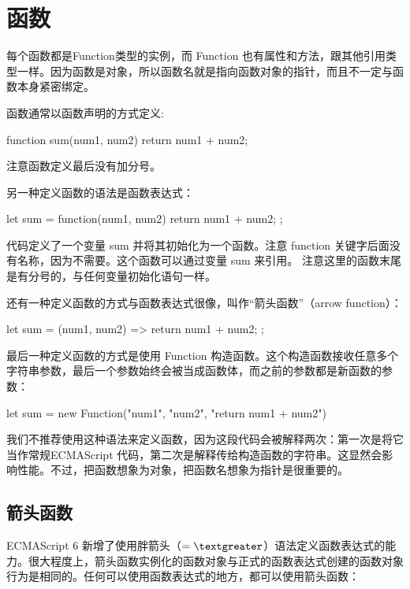 \chapter{函数}
每个函数都是Function类型的实例，而 Function 也有属性和方法，跟其他引用类型一样。因为函数是对象，所以函数名就是指向函数对象的指针，而且不一定与函数本身紧密绑定。

函数通常以函数声明的方式定义:
\begin{js}
function sum(num1, num2) {
    return num1 + num2;
}
\end{js}
注意函数定义最后没有加分号。

另一种定义函数的语法是函数表达式：
\begin{js}
let sum = function(num1, num2) {
    return num1 + num2;
};
\end{js}

代码定义了一个变量 sum 并将其初始化为一个函数。注意 function 关键字后面没有名称，因为不需要。这个函数可以通过变量 sum 来引用。 注意这里的函数末尾是有分号的，与任何变量初始化语句一样。

还有一种定义函数的方式与函数表达式很像，叫作“箭头函数”（arrow function）：
\begin{js}
let sum = (num1, num2) => {
    return num1 + num2;
};
\end{js}

最后一种定义函数的方式是使用 Function 构造函数。这个构造函数接收任意多个字符串参数，最后一个参数始终会被当成函数体，而之前的参数都是新函数的参数：
\begin{js}
let sum = new Function("num1", "num2", "return num1 + num2")
\end{js}

我们不推荐使用这种语法来定义函数，因为这段代码会被解释两次：第一次是将它当作常规ECMAScript 代码，第二次是解释传给构造函数的字符串。这显然会影响性能。不过，把函数想象为对象，把函数名想象为指针是很重要的。


\section{箭头函数}
ECMAScript 6 新增了使用胖箭头（$=\textgreater$）语法定义函数表达式的能力。很大程度上，箭头函数实例化的函数对象与正式的函数表达式创建的函数对象行为是相同的。任何可以使用函数表达式的地方，都可以使用箭头函数：

